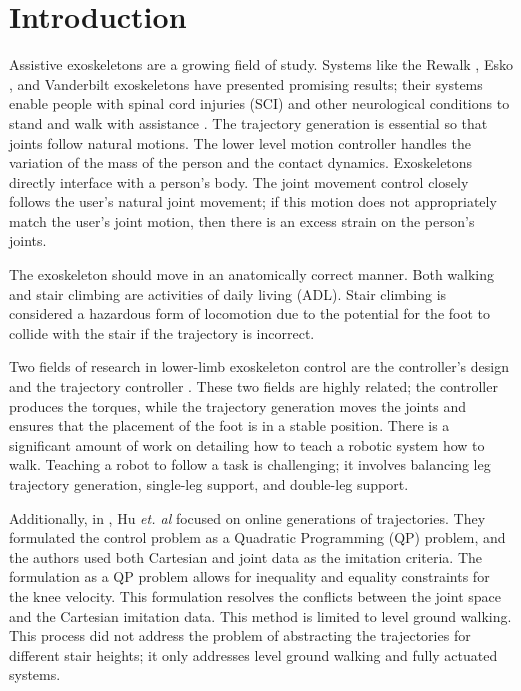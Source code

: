 \section{Introduction} 

Assistive exoskeletons are a growing field of study. Systems like the Rewalk \cite{esquenazi2012rewalk}, Esko \cite{mertz2012next}, and Vanderbilt exoskeletons \cite{gasser2017design} have presented promising results; their systems enable people with spinal cord injuries (SCI) and other neurological conditions to stand and walk with assistance \cite{farris2013preliminary}. The trajectory generation is essential so that joints follow natural motions. The lower level motion controller handles the variation of the mass of the person and the contact dynamics. Exoskeletons directly interface with a person's body. The joint movement control closely follows the user’s natural joint movement; if this motion does not appropriately match the user's joint motion, then there is an excess strain on the person’s joints.

The exoskeleton should move in an anatomically correct manner. Both walking and stair climbing are activities of daily living (ADL). Stair climbing is considered a hazardous form of locomotion \cite{HicksLittle2011LowerEJ}  due to the potential for the foot to collide with the stair if the trajectory is incorrect.  

Two fields of research in lower-limb exoskeleton control are the controller's design and the trajectory controller \cite{huang2016optimisation}. These two fields are highly related; the controller produces the torques, while the trajectory generation moves the joints and ensures that the placement of the foot is in a stable position. There is a significant amount of work on detailing how to teach a robotic system how to walk. Teaching a robot to follow a task is challenging; it involves balancing leg trajectory generation, single-leg support, and double-leg support.

Additionally, in \cite{taskjointmocap}, Hu \textit{et. al} focused on online generations of trajectories. They formulated the control problem as a Quadratic Programming (QP) problem, and the authors used both Cartesian and joint data as the imitation criteria. The formulation as a QP problem allows for inequality and equality constraints for the knee velocity. This formulation resolves the conflicts between the joint space and the Cartesian imitation data. This method is limited to level ground walking. This process did not address the problem of abstracting the trajectories for different stair heights; it only addresses level ground walking and fully actuated systems.

